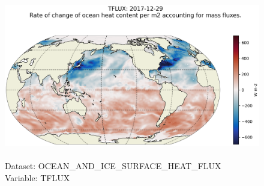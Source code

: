 \begin{figure}[H]
\centering
\includegraphics[scale=0.5]{../images/plots/latlon_plots/Ocean_and_Sea-Ice_Surface_Heat_Fluxes/TFLUX.png}
\caption{\\Dataset: OCEAN\_AND\_ICE\_SURFACE\_HEAT\_FLUX\\Variable: TFLUX}
\label{tab:table-OCEAN_AND_ICE_SURFACE_HEAT_FLUX_TFLUX-Plot}
\end{figure}
\pagebreak
